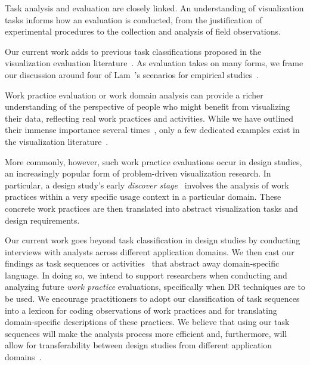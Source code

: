 Task analysis and evaluation are closely linked. 
An understanding of visualization tasks informs how an evaluation is conducted, from the justification of experimental procedures to the collection and analysis of field observations.

Our current work adds to previous task classifications proposed in the visualization evaluation literature~\cite{Henry2006,Lee2006,Valiati2006}.
As evaluation takes on many forms, we frame our discussion around four of Lam~\etal's scenarios for empirical studies~\cite{Lam2012}.

Work practice evaluation or work domain analysis can provide a richer understanding of the perspective of people who might benefit from visualizing their data, reflecting real work practices and activities.
While we have outlined their immense importance several times~\cite{Brehmer2014a,Meyer2015,Munzner2009}, only a few dedicated examples exist in the visualization literature~\cite{Kandel2012,Kang2011,Tory2008}.

More commonly, however, such work practice evaluations occur in design studies, an increasingly popular form of problem-driven visualization research.
In particular, a design study's early {\it discover stage}~\cite{Sedlmair2012} involves the analysis of work practices within a very specific usage context in a particular domain.
These concrete work practices are then translated into abstract visualization tasks and design requirements.

Our current work goes beyond task classification in design studies by conducting interviews with analysts across different application domains. 
We then cast our findings as task sequences or activities~\cite{Norman2005} that abstract away domain-specific language.
In doing so, we intend to support researchers when conducting and analyzing future {\it work practice} evaluations, 
specifically when \ac{DR} techniques are to be used. 
We encourage practitioners to adopt our classification of task sequences into a lexicon for coding observations of work practices and for translating domain-specific descriptions of these practices.
We believe that using our task sequences will make the analysis process more efficient and, furthermore, will allow for transferability between design studies from different application domains~\cite{Sedlmair2012}.

